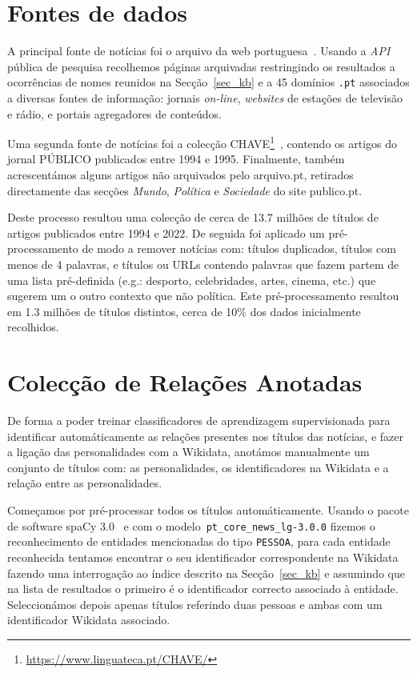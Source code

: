 \documentclass[a4paper, twocolumn, 11pt, twoside]{article}
\begin{document}
\section{Fontes de dados}
\label{sec:data_sources}

A principal fonte de notícias foi o arquivo da web portuguesa~\citep{SearchPastPWA2013}. Usando a \textit{API} pública de pesquisa recolhemos páginas arquivadas restringindo os resultados a ocorrências de nomes reunidos na Secção~\ref{sec_kb} e a 45 domínios \texttt{.pt} associados a diversas fontes de informação: jornais \textit{on-line}, \textit{websites} de estações de televisão e rádio, e portais agregadores de conteúdos. 

Uma segunda fonte de notícias foi a colecção CHAVE\footnote{\url{https://www.linguateca.pt/CHAVE/}}~\citep{DBLP:conf/clef/SantosR04, santos-rocha-2001-evaluating}, contendo os artigos do jornal PÚBLICO publicados entre 1994 e 1995. Finalmente, também acrescentámos alguns artigos não arquivados pelo arquivo.pt, retirados directamente das secções {\it Mundo}, {\it Política} e {\it Sociedade} do site publico.pt. 

Deste processo resultou uma colecção de cerca de 13.7 milhões de títulos de artigos publicados entre 1994 e 2022. De seguida foi aplicado um pré-processamento de modo a remover notícias com: títulos duplicados, títulos com menos de 4 palavras, e títulos ou URLs contendo palavras que fazem partem de uma lista pré-definida (e.g.: desporto, celebridades, artes, cinema, etc.) que sugerem um o outro contexto que não política. Este pré-processamento resultou em 1.3 milhões de títulos distintos, cerca de 10\% dos dados inicialmente recolhidos.

\section{Colecção de Relações Anotadas}
\label{sec:rel_data_annot}

De forma a poder treinar classificadores de aprendizagem supervisionada para identificar automáticamente as relações presentes nos títulos das notícias, e fazer a ligação das personalidades com a Wikidata, anotámos manualmente um conjunto de títulos com: as personalidades, os identificadores na Wikidata e a relação entre as personalidades.

Começamos por pré-processar todos os títulos automáticamente. Usando o pacote de software spaCy 3.0~\citep{spacy} e com o modelo~\texttt{pt\_core\_news\_lg-3.0.0} fizemos o reconhecimento de entidades mencionadas do tipo \texttt{PESSOA}, para cada entidade reconhecida tentamos encontrar o seu identificador correspondente na Wikidata fazendo uma interrogação ao índice descrito na Secção~\ref{sec_kb} e assumindo que na lista de resultados o primeiro é o identificador correcto associado à entidade. Seleccionámos depois apenas títulos referindo duas pessoas e ambas com um identificador Wikidata associado.
\end{document}
